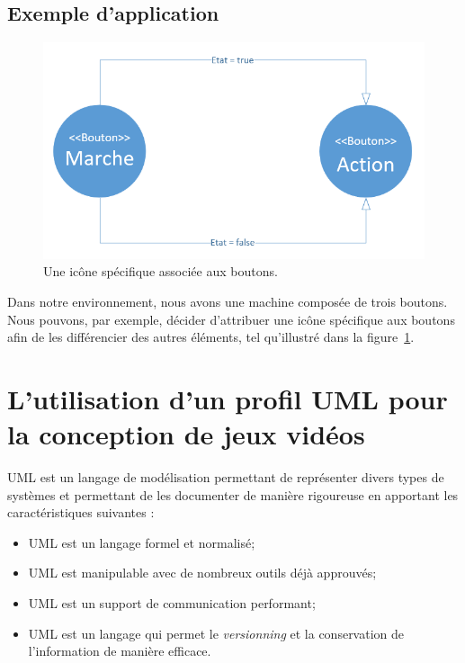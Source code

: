 \subsection{Exemple d'application}


\begin{figure}
    \begin{center}
    \includegraphics[width=12cm]{10_img/chap4/img.PNG}
    \caption{Une ic\^one spécifique associ\'ee aux boutons.}
    \label{fig.uml_img}
    \end{center}
\end{figure}

Dans notre environnement, nous avons une machine composée de trois boutons.
Nous pouvons, par exemple, décider d'attribuer une ic\^one spécifique aux boutons afin de les différencier des autres éléments, tel qu'illustr\'e dans la figure~\ref{fig.uml_img}.




\section{L'utilisation d'un profil UML pour la conception de jeux vidéos}


UML est un langage de modélisation permettant de représenter divers types de systèmes et permettant de les documenter de manière rigoureuse en apportant les caractéristiques suivantes :

\begin{itemize}
    \item UML est un langage formel et normalisé;
    \item UML est manipulable avec de nombreux outils déjà approuvés;
    \item UML est un support de communication performant;
    \item UML est un langage qui permet le \emph{versionning} et la conservation de l'information de manière efficace.
\end{itemize}

